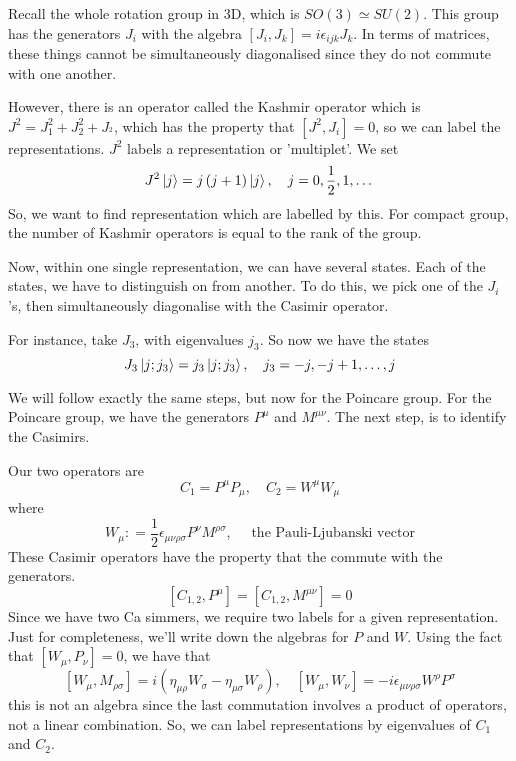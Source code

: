 \documentclass[11pt, oneside]{article}   	%
\theoremstyle{slanted}
\begin{document}
Recall the whole rotation group in 3D, 
which is $ SO ( 3 ) \simeq SU (  2 )  $. 
This group has the generators $ J _ i $
with the algebra $ \left[  J _ i , J _ k  \right]  = i \epsilon _{ ijk } J _ k  $. 
In terms of matrices, 
these things cannot be simultaneously diagonalised 
since they do not commute with one another. 

However, there is an operator called the
Kashmir operator which is $ J ^ 2  = J_ 1 ^ 2 + J _ 2 ^ 2 + J _ ^ 2 $, 
which has the property that  $ \left[  J ^ 2 , J _ i  \right]   = 0 $, 
so we can label the representations.
$ J ^ 2 $ labels a representation or 'multiplet'. 
We set 
\[
	J ^ 2 \ket{ j }  = j \left( j + 1   \right)  \ket{ j } , \quad j = 0 , \frac{1}{2 }, 1 , \dots 
\] So, we want to find representation which are labelled by this. 
For compact group, the number of Kashmir operators 
is equal to the rank of the group. 

Now, within one single representation, we can have 
several states. Each of the states, 
we have to distinguish on from another. 
To do this, we pick one of the $ J  _i   $'s, 
then simultaneously diagonalise with the 
Casimir operator. 

For instance, take $ J _ 3 $, with eigenvalues 
$ j _ 3 $. 
So now we have the states 
\[
 J _ 3  \ket{ j ;  j _ 3 }  = j _ 3 \ket{ j ;  j _ 3 } , \quad j _ 3 = - j ,  - j + 1 , \dots , j 
\] 

We will follow exactly the same steps, 
but now for the Poincare group. 
For the Poincare group, 
we have the generators $ P ^ \mu $ and $ M ^{ \mu \nu } $. 
The next step, is to identify the 
Casimirs. 

Our two operators are 
\[
 C _ 1  = P ^ \mu P _ \mu , \quad C _ 2  = W ^ \mu W _ \mu 
\] where 
\[
 W _ \mu : = \frac{1}{2 } \epsilon _{ \mu \nu \rho \sigma  } P ^ \nu M ^{ \rho \sigma } , \quad 
 \text{ the Pauli-Ljubanski vector}
\] These Casimir operators 
have the property that the 
commute with the generators. 
\[
 \left[  C _{ 1, 2 }, P ^ \mu   \right]   = \left[  C _{ 1, 2 } , M ^{ \mu \nu }  \right]   = 0
\]  Since 
we have two Ca simmers, 
we require two labels for 
a given representation. 
Just for completeness, we'll write 
down the algebras for $ P  $ and $  W $. 
Using the fact that $ \left[  W _ \mu , P _ \nu  \right]   =0 $, 
we have that 
\[
	\left[  W _ \mu , M _{ \rho \sigma  }  \right]   = i \left( 
	\eta _{ \mu \rho  } W _ \sigma  - \eta _{ \mu \sigma } W _ \rho \right)  , \quad 
	\left[  W _\mu , W _ \nu   \right]   = - i \epsilon _{ \mu \nu \rho \sigma } 
	W ^ \rho P ^ \sigma 
\] this is not an algebra since 
the last commutation 
involves a product of operators, 
not a linear combination. So, we can label 
representations by eigenvalues of $ C _ 1 $ and $ C _ 2 $. 
\end{document}
